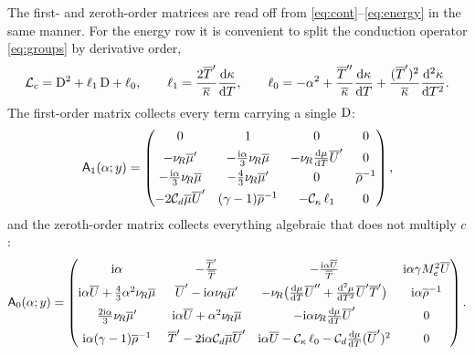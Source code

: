 \documentclass[11pt]{article}
\begin{document}
The first- and zeroth-order matrices are read off from \eqref{eq:cont}--\eqref{eq:energy} in the
same manner. For the energy row it is convenient to split the conduction operator \eqref{eq:groups}
by derivative order,
\begin{equation}\label{eq:lcsplit}
  \mathcal L_c=\mathrm{D}^2+\ell_1\,\mathrm{D}+\ell_0,\qquad
  \ell_1=\frac{2\overline{T}'}{\overline{\kappa}}\frac{\mathrm d\kappa}{\mathrm dT},\qquad
  \ell_0=-\alpha^2+\frac{\overline{T}''}{\overline{\kappa}}\frac{\mathrm d\kappa}{\mathrm dT}
        +\frac{(\overline{T}')^2}{\overline{\kappa}}\frac{\mathrm d^2\kappa}{\mathrm dT^2}.
\end{equation}
The first-order matrix collects every term carrying a single $\mathrm{D}$:
\begin{equation}\label{eq:A1mat}
  \mathsf A_1(\alpha;y)=
  \begin{pmatrix}
    0 & 1 & 0 & 0\\[3pt]
    -\nu_{\!R}\overline{\mu}' & -\tfrac{\mathrm{i}\alpha}{3}\nu_{\!R}\overline{\mu} & -\nu_{\!R}\tfrac{\mathrm d\mu}{\mathrm dT}\overline{U}' & 0\\[3pt]
    -\tfrac{\mathrm{i}\alpha}{3}\nu_{\!R}\overline{\mu} & -\tfrac43\nu_{\!R}\overline{\mu}' & 0 & \overline{\rho}^{-1}\\[3pt]
    -2\mathcal C_d\overline{\mu}\overline{U}' & (\gamma-1)\overline{\rho}^{-1} & -\mathcal C_\kappa\,\ell_1 & 0
  \end{pmatrix},
\end{equation}
and the zeroth-order matrix collects everything algebraic that does not multiply $c$:
{\small
\begin{equation}\label{eq:A0mat}
  \mathsf A_0(\alpha;y)=
  \begin{pmatrix}
    \mathrm{i}\alpha & -\tfrac{\overline{T}'}{\overline{T}} & -\tfrac{\mathrm{i}\alpha\overline{U}}{\overline{T}} &
      \mathrm{i}\alpha\gamma M_e^2\overline{U}\\[5pt]
    \mathrm{i}\alpha\overline{U}+\tfrac43\alpha^2\nu_{\!R}\overline{\mu} & \overline{U}'-\mathrm{i}\alpha\nu_{\!R}\overline{\mu}' &
      -\nu_{\!R}\big(\tfrac{\mathrm d\mu}{\mathrm dT}\overline{U}''
        +\tfrac{\mathrm d^2\mu}{\mathrm dT^2}\overline{U}'\overline{T}'\big) & \mathrm{i}\alpha\overline{\rho}^{-1}\\[5pt]
    \tfrac{2\mathrm{i}\alpha}{3}\nu_{\!R}\overline{\mu}' & \mathrm{i}\alpha\overline{U}+\alpha^2\nu_{\!R}\overline{\mu} &
      -\mathrm{i}\alpha\nu_{\!R}\tfrac{\mathrm d\mu}{\mathrm dT}\overline{U}' & 0\\[5pt]
    \mathrm{i}\alpha(\gamma-1)\overline{\rho}^{-1} & \overline{T}'-2\mathrm{i}\alpha\mathcal C_d\overline{\mu}\overline{U}' &
      \mathrm{i}\alpha\overline{U}-\mathcal C_\kappa\,\ell_0
        -\mathcal C_d\tfrac{\mathrm d\mu}{\mathrm dT}(\overline{U}')^2 & 0
  \end{pmatrix}.
\end{equation}}%
\end{document}
